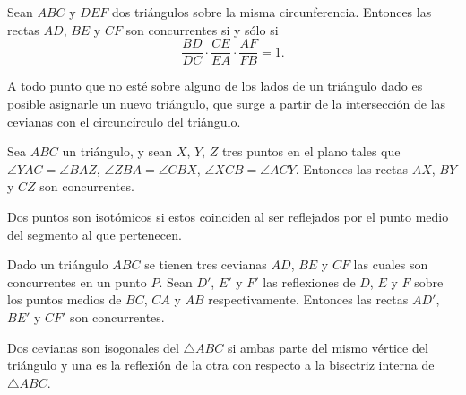 \documentclass[12pt]{article}
\begin{document}
   \section{}
   \begin{section-theorem}
      Sean $ABC$ y $DEF$ dos triángulos sobre la misma circunferencia.
      Entonces las rectas $AD$, $BE$ y $CF$ son concurrentes si y sólo si
      \[\frac{BD}{DC} \cdot \frac{CE}{EA} \cdot \frac{AF}{FB} = 1.\]
   \end{section-theorem}

   \begin{section-definition}
      A todo punto que no esté sobre alguno de los lados de un triángulo dado es posible asignarle un nuevo triángulo, que surge a partir de la intersección de las cevianas con el circuncírculo del triángulo.
   \end{section-definition}

   \begin{section-theorem}
   \end{section-theorem}

   \begin{section-theorem}
      Sea $ABC$ un triángulo, y sean $X$, $Y$, $Z$ tres puntos en el plano tales que $\angle YAC = \angle BAZ$, $\angle ZBA = \angle CBX$, $\angle XCB = \angle ACY$.
      Entonces las rectas $AX$, $BY$ y $CZ$ son concurrentes.
   \end{section-theorem}

   \begin{section-definition}
      Dos puntos son isotómicos si estos coinciden al ser reflejados por el punto medio del segmento al que pertenecen.
   \end{section-definition}

   \begin{section-definition}
      Dado un triángulo $ABC$ se tienen tres cevianas $AD$, $BE$ y $CF$ las cuales son concurrentes en un punto $P$.
      Sean $D'$, $E'$ y $F'$ las reflexiones de $D$, $E$ y $F$ sobre los puntos medios de $BC$, $CA$ y $AB$ respectivamente.
      Entonces las rectas $AD'$, $BE'$ y $CF'$ son concurrentes.
   \end{section-definition}

   \begin{section-definition}
      Dos cevianas son isogonales del $\triangle ABC$ si ambas parte del mismo vértice del triángulo y una es la reflexión de la otra con respecto a la bisectriz interna de $\triangle ABC$.
   \end{section-definition}
\end{document}
